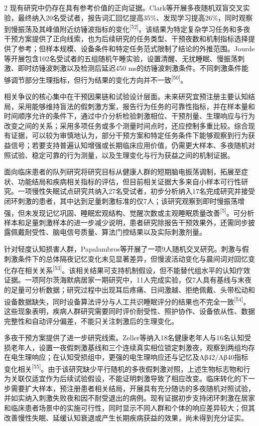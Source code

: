 \documentclass[UTF8,zihao=5,fontset=none]{ctexart}
\newcommand{\hei}{\CJKfamily{hei}}
\newcommand{\leveltwo}[1]{%
  \par\noindent{\hei\fontsize{10.5pt}{15.6pt}\selectfont\bfseries #1\par}}
\newcommand{\refcite}[1]{\nolinebreak[4]\textsuperscript{[#1]}}
\begin{document}
\begin{multicols}{2}
现有研究中仍存在具有参考价值的正向证据。Clark等开展多夜随机双盲交叉实验，最终纳入20名受试者，报告词汇回忆提高35\%、发现学习提高26\%，同时观察到慢振荡及其峰值附近纺锤波指标的变化\refcite{52}。该结果为特定复杂学习任务和多夜干预方案提供了正向线索，也为后续研究的任务类型、干预夜数和机制指标选择提供了参考；但样本规模、设备条件和特定任务范式限制了结论的外推范围。Jourde等开展包含102名受试者的五组随机午睡实验，设置清醒、无扰睡眠、慢振荡刺激、即时纺锤波刺激以及检测后延迟450 ms的纺锤波刺激条件。不同刺激条件能够调节部分生理指标，但行为结果的变化方向并不一致\refcite{50}。\par

相关争议的核心集中在干预因果链和试验设计层面。未来研究宜预注册主要认知结局，采用能够维持盲法的假刺激方案，报告行为任务的可靠性指标，并在样本量和时间顺序允许的条件下，通过中介分析检验刺激相位、干预剂量、生理响应与行为改变之间的关系；采用多项任务或多个测量时间点时，还应控制多重比较。综合现有证据，可以较为审慎地认为，部分干预方案和特定任务条件下能够观察到行为获益信号；若要支持普遍认知增强或长期临床应用价值，仍需更大样本、多夜随机对照试验、稳定可靠的行为测量，以及生理变化与行为获益之间的机制证据。\par

\leveltwo{3.4 慢性失眠、阿尔茨海默病等临床队列研究进展}

面向临床患者的队列研究将研究目标从健康人群的短期脑电振荡调制，拓展至症状、功能结局和疾病相关指标的评估，但目前相关证据大多来自小样本可行性研究。一项慢性失眠试点研究共纳入27名受试者，初步分析纳入17名完成研究并接受闭环刺激的患者，其中达到足量刺激标准的仅7人；该研究观察到即时慢振荡增强，但未发现记忆巩固、睡眠宏观结构、觉醒次数或主观睡眠质量改善\refcite{5}。可分析样本和足量刺激样本的进一步减少说明，患者研究除报告干预效果外，还需同步披露佩戴耐受性、脑电信号质量、算法门控结果以及实际刺激剂量。\par

针对轻度认知损害人群，Papalambros等开展了一项9人随机交叉研究。刺激与假刺激条件下的总体隔夜记忆变化未见显著差异，但慢波活动变化与晨间词对回忆变化存在相关关系\refcite{53}。该相关结果可支持机制假设，但不能替代组水平的认知疗效证据。一项阿尔茨海默病居家一期研究中，11人完成实验，仅7人具有基线与末夜的足量可分析数据；研究过程中出现耳后疼痛、日间激越、拒绝佩戴、头带松动和设备数据缺失，同时设备算法评分与人工共识睡眠评分的结果也不完全一致\refcite{54}。这些现象表明，疾病人群研究需要同时评价耐受性、照护协作、设备依从性、数据完整性和自动评分偏差，不能只关注刺激后的生理变化。\par

多夜干预方案提供了进一步研究线索。Zeller等纳入18名健康老年人与16名认知受损老年人，设置一夜假刺激基线和三个连续真实相位锁定刺激夜，观察到两组均存在电生理响应；在认知受损组中，更强的电生理响应还与记忆及Aβ42/Aβ40指标变化相关\refcite{55}。由于该研究缺少平行随机的多夜假刺激对照，上述生物标志物和行为关联仅适宜作为后续试验假设，不能证明刺激导致了相应改变。临床转化的下一步需要扩大样本，预注册患者相关结局，开展具有充分随访的多夜随机对照试验，并如实纳入刺激失败夜和因不耐受退出的病例。现有证据初步支持闭环刺激在居家和临床患者场景中的实施可行性，同时显示不同人群和个体的响应差异较大；但其改善慢性失眠、延缓认知衰退或产生长期疾病获益的效果，尚未得到充分证实。\par


\end{multicols}
\end{document}
